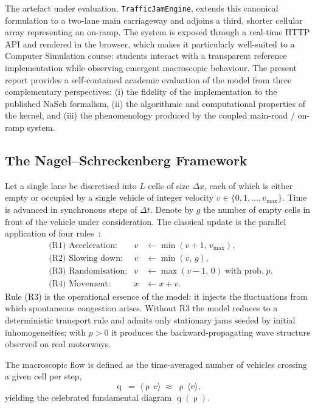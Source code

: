 \documentclass[11pt,a4paper]{article}
\DeclareMathOperator{\flow}{q}
\DeclareMathOperator{\dens}{\rho}
\begin{document}
The artefact under evaluation, \texttt{TrafficJamEngine}, extends this
canonical formulation to a two-lane main carriageway and adjoins a third,
shorter cellular array representing an on-ramp. The system is exposed
through a real-time HTTP API and rendered in the browser, which makes it
particularly well-suited to a Computer Simulation course: students interact
with a transparent reference implementation while observing emergent
macroscopic behaviour. The present report provides a self-contained academic
evaluation of the model from three complementary perspectives: (i) the
fidelity of the implementation to the published NaSch formalism, (ii) the
algorithmic and computational properties of the kernel, and (iii) the
phenomenology produced by the coupled main-road / on-ramp system.

\subsection{The Nagel--Schreckenberg Framework}

Let a single lane be discretised into $L$ cells of size $\Delta x$, each of
which is either empty or occupied by a single vehicle of integer velocity
$v\in\{0,1,\ldots,v_{\max}\}$. Time is advanced in synchronous steps of
$\Delta t$. Denote by $g$ the number of empty cells in front of the vehicle
under consideration. The classical update is the parallel application of
four rules~\cite{nasch1992}:
\begin{align}
&\text{(R1) Acceleration:} & v &\leftarrow \min(v+1,\,v_{\max}), \label{eq:R1}\\
&\text{(R2) Slowing down:} & v &\leftarrow \min(v,\,g),            \label{eq:R2}\\
&\text{(R3) Randomisation:} & v &\leftarrow \max(v-1,\,0)\;\text{with prob.}\;p, \label{eq:R3}\\
&\text{(R4) Movement:}      & x &\leftarrow x + v.                  \label{eq:R4}
\end{align}
Rule (R3) is the operational essence of the model: it injects the
fluctuations from which spontaneous congestion arises. Without R3 the model
reduces to a deterministic transport rule and admits only stationary jams
seeded by initial inhomogeneities; with $p>0$ it produces the
backward-propagating wave structure observed on real motorways.

The macroscopic flow is defined as the time-averaged number of vehicles
crossing a given cell per step,
\begin{equation}
\flow \;=\; \big\langle \dens\,v \big\rangle \;\approx\; \dens\, \langle v\rangle,
\label{eq:flow}
\end{equation}
yielding the celebrated fundamental diagram $\flow(\dens)$.
\end{document}
